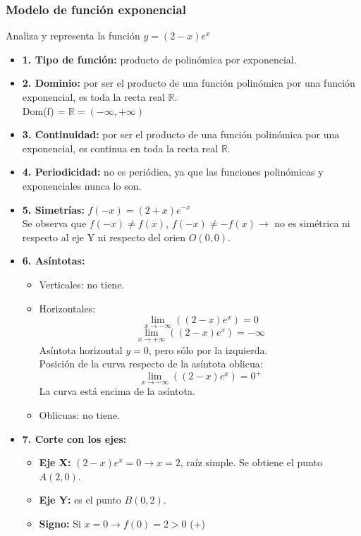 \subsubsection{Modelo de función exponencial}
Analiza y representa la función $y=(2-x)e^x$
\begin{itemize}
	\item \textbf{1. Tipo de función: }producto de polinómica por exponencial.
	\item \textbf{2. Dominio: }por ser el producto de una función polinómica por una función exponencial, es toda la recta real $\mathbb{R}$.\\
	Dom(f) = $\mathbb{R}=(-\infty, +\infty)$
	\item \textbf{3. Continuidad: }por ser el producto de una función polinómica por una exponencial, es continua en toda la recta real $\mathbb{R}$. 
	\item \textbf{4. Periodicidad: }no es periódica, ya que las funciones polinómicas y exponenciales nunca lo son.
	\item \textbf{5. Simetrías: }$f(-x)=(2+x)e^{-x}$\\
	Se observa que $f(-x)\neq f(x)$, $f(-x) \neq -f(x) \rightarrow$ no es simétrica ni respecto al eje Y ni respecto del orien $O(0,0)$.
	\item \textbf{6. Asíntotas: }\\
	\begin{itemize}
		\item Verticales: no tiene.
		\item Horizontales: \\
		$$\lim_{x \to -\infty}((2-x)e^x)=0$$
		$$\lim_{x \to +\infty}((2-x)e^x)=-\infty$$
		Asíntota horizontal $y=0$, pero sólo por la izquierda.\\
		Posición de la curva respecto de la asíntota oblicua:
		$$\lim_{x \to -\infty}((2-x)e^x)=0^{+}$$
		La curva está encima de la asíntota.
		\item Oblicuas: no tiene.
	\end{itemize}
	\item \textbf{7. Corte con los ejes: }
	\begin{itemize}
		\item \textbf{Eje X: }$(2-x)e^{x} = 0 \rightarrow x=2$, raíz simple. Se obtiene el punto $A(2,0)$.
		\item \textbf{Eje Y: }es el punto $B(0,2)$.
		\item \textbf{Signo: }Si $x=0 \rightarrow f(0)=2 >0$ (+)
	\end{itemize}

\end{itemize}
